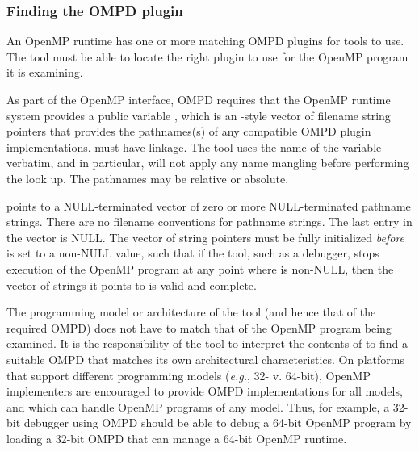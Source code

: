 \subsubsection{Finding the OMPD plugin}
\label{sec:ompd:finding-the-ompd}

An OpenMP runtime has one or more matching OMPD plugins for 
tools to use.
The tool must be able to locate the right plugin to use
for the OpenMP program it is examining.

As part of the OpenMP interface, OMPD requires that the OpenMP
runtime system provides a public variable ,
which is an -style vector of filename string pointers that
provides the pathnames(s) of any compatible OMPD plugin implementations.
 must have  linkage.
The tool uses the name of the variable verbatim,
and in particular, will not apply any name mangling before
performing the look up.
The pathnames may be relative or absolute.

 points to a NULL-terminated
vector of zero or more NULL-terminated pathname strings.
There are no filename conventions for pathname strings.
The last entry in the vector is NULL.
The vector of string pointers must be fully initialized \emph{before}
 is set to a non-NULL value,
such that if the tool, such as a debugger,
stops execution of the OpenMP program at any point where
 is non-NULL,
then the vector of strings it points to is valid and complete.

The programming model or architecture of the tool (and hence
that of the required OMPD) does not have to match that of the OpenMP program
being examined.
It is the responsibility of the tool to interpret the contents
of  to find a suitable OMPD that matches
its own architectural characteristics.
On platforms that support different programming models
(\textit{e.g.}, 32- v. 64-bit), OpenMP implementers are encouraged
to provide OMPD implementations for all models, and which can handle
OpenMP programs of any model.
Thus, for example, a 32-bit debugger using OMPD should be able
to debug a 64-bit OpenMP program
by loading a 32-bit OMPD that can manage a 64-bit OpenMP runtime.

